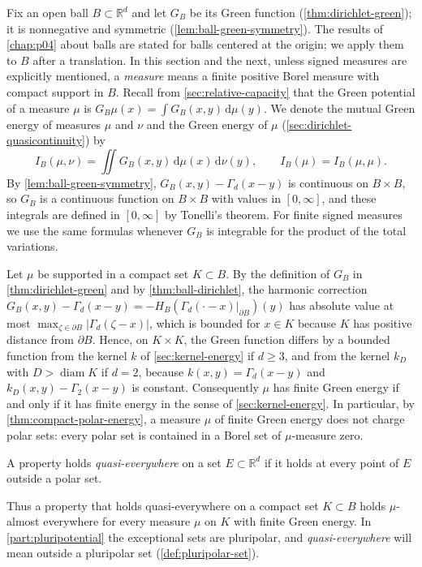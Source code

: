 Fix an open ball $B\subset\mathbb R^d$ and let $G_B$ be its Green function (\cref{thm:dirichlet-green}); it is nonnegative and symmetric (\cref{lem:ball-green-symmetry}). The results of \cref{chap:p04} about balls are stated for balls centered at the origin; we apply them to $B$ after a translation. In this section and the next, unless signed measures are explicitly mentioned, a \emph{measure} means a finite positive Borel measure with compact support in $B$. Recall from \cref{sec:relative-capacity} that the Green potential of a measure $\mu$ is $G_B\mu(x)=\int G_B(x,y)\,\mathrm d\mu(y)$. We denote the mutual Green energy of measures $\mu$ and $\nu$ and the Green energy of $\mu$ (\cref{sec:dirichlet-quasicontinuity}) by
\[
 I_B(\mu,\nu)=\iint G_B(x,y)\,\mathrm d\mu(x)\,\mathrm d\nu(y),\qquad I_B(\mu)=I_B(\mu,\mu).
\]
By \cref{lem:ball-green-symmetry}, $G_B(x,y)-\Gamma_d(x-y)$ is continuous on $B\times B$, so $G_B$ is a continuous function on $B\times B$ with values in $[0,\infty]$, and these integrals are defined in $[0,\infty]$ by Tonelli's theorem. For finite signed measures we use the same formulas whenever $G_B$ is integrable for the product of the total variations.

Let $\mu$ be supported in a compact set $K\subset B$. By the definition of $G_B$ in \cref{thm:dirichlet-green} and by \cref{thm:ball-dirichlet}, the harmonic correction $G_B(x,y)-\Gamma_d(x-y)=-H_B(\Gamma_d(\cdot-x)|_{\partial B})(y)$ has absolute value at most $\max_{\zeta\in\partial B}|\Gamma_d(\zeta-x)|$, which is bounded for $x\in K$ because $K$ has positive distance from $\partial B$. Hence, on $K\times K$, the Green function differs by a bounded function from the kernel $k$ of \cref{sec:kernel-energy} if $d\geq3$, and from the kernel $k_D$ with $D>\operatorname{diam}K$ if $d=2$, because $k(x,y)=\Gamma_d(x-y)$ and $k_D(x,y)-\Gamma_2(x-y)$ is constant. Consequently $\mu$ has finite Green energy if and only if it has finite energy in the sense of \cref{sec:kernel-energy}. In particular, by \cref{thm:compact-polar-energy}, a measure $\mu$ of finite Green energy does not charge polar sets: every polar set is contained in a Borel set of $\mu$-measure zero.

\begin{definition}\label{def:quasi-everywhere}
A property holds \emph{quasi-everywhere} on a set $E\subset\mathbb R^d$ if it holds at every point of $E$ outside a polar set.
\end{definition}
Thus a property that holds quasi-everywhere on a compact set $K\subset B$ holds $\mu$-almost everywhere for every measure $\mu$ on $K$ with finite Green energy. In \cref{part:pluripotential} the exceptional sets are pluripolar, and \emph{quasi-everywhere} will mean outside a pluripolar set (\cref{def:pluripolar-set}).

